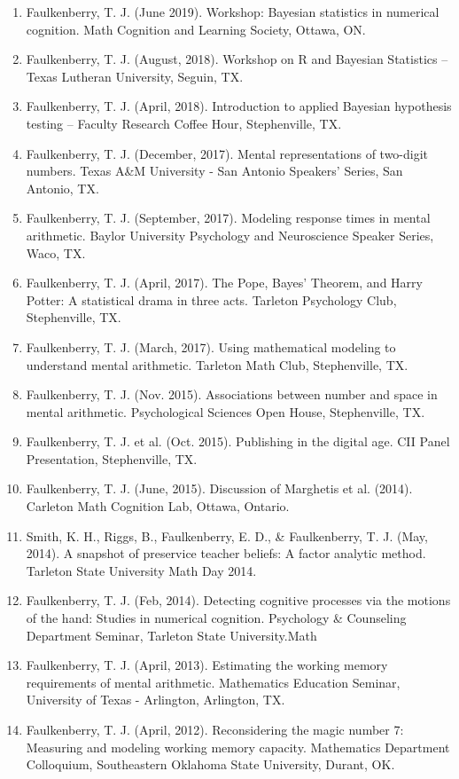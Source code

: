 \documentclass[article,10pt]{article}
\begin{document}
\begin{enumerate}
\item Faulkenberry, T. J. (June 2019). Workshop: Bayesian statistics in numerical cognition. Math Cognition and Learning Society, Ottawa, ON.
\item Faulkenberry, T. J. (August, 2018). Workshop on R and Bayesian Statistics -- Texas Lutheran University, Seguin, TX.
\item Faulkenberry, T. J. (April, 2018). Introduction to applied Bayesian hypothesis testing -- Faculty Research Coffee Hour, Stephenville, TX.
\item Faulkenberry, T. J. (December, 2017). Mental representations of two-digit numbers. Texas A\&M University - San Antonio Speakers' Series, San Antonio, TX.
\item Faulkenberry, T. J. (September, 2017). Modeling response times in mental arithmetic. Baylor University Psychology and Neuroscience Speaker Series, Waco, TX.
\item Faulkenberry, T. J. (April, 2017). The Pope, Bayes' Theorem, and Harry Potter: A statistical drama in three acts.  Tarleton Psychology Club, Stephenville, TX.
\item Faulkenberry, T. J. (March, 2017). Using mathematical modeling to understand mental arithmetic. Tarleton Math Club, Stephenville, TX.
\item Faulkenberry, T. J. (Nov. 2015). Associations between number and space in mental arithmetic.  Psychological Sciences Open House, Stephenville, TX.
\item Faulkenberry, T. J. et al. (Oct. 2015). Publishing in the digital age.  CII Panel Presentation, Stephenville, TX.
\item Faulkenberry, T. J. (June, 2015). Discussion of Marghetis et al. (2014). Carleton Math Cognition Lab, Ottawa, Ontario.
\item Smith, K. H., Riggs, B., Faulkenberry, E. D., \& Faulkenberry, T. J. (May, 2014). A snapshot of preservice teacher beliefs: A factor analytic method. Tarleton State University Math Day 2014.
\item Faulkenberry, T. J. (Feb, 2014). Detecting cognitive processes via the motions of the hand: Studies in numerical cognition.  Psychology \& Counseling Department Seminar, Tarleton State University.Math
\item Faulkenberry, T. J. (April, 2013). Estimating the working memory requirements of mental arithmetic. Mathematics Education Seminar, University of Texas - Arlington, Arlington, TX.
\item Faulkenberry, T. J. (April, 2012). Reconsidering the magic number 7: Measuring and modeling working memory capacity. Mathematics Department Colloquium, Southeastern Oklahoma State University, Durant, OK.

\end{enumerate}
\end{document}

